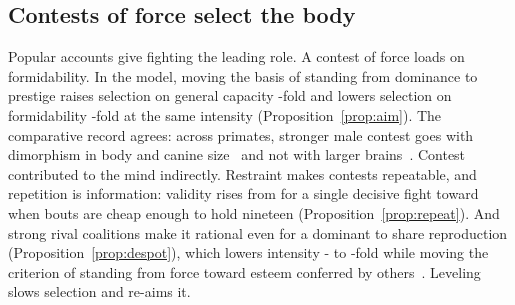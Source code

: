 \subsection{Contests of force select the body}\label{sec:rescontest}

Popular accounts give fighting the leading role. A contest of force loads on formidability. In the model, moving the basis
of standing from dominance to prestige raises selection on general capacity \AimGain-fold and lowers selection on
formidability \AimLoss-fold at the same intensity (Proposition~\ref{prop:aim}). The comparative record agrees: across primates,
stronger male contest goes with dimorphism in body and canine size~\cite{plavcan2012} and not with larger
brains~\cite{schillaci2006,lemaitre2009,fitzpatrick2012}. Contest contributed to the mind indirectly. Restraint makes contests
repeatable, and repetition is information: validity rises from \RepROne{} for a single decisive fight toward \RepRsafe{} when
bouts are cheap enough to hold nineteen (Proposition~\ref{prop:repeat}). And strong rival coalitions make it rational even for
a dominant to share reproduction (Proposition~\ref{prop:despot}), which lowers intensity \DesIntLo- to \DesIntHi-fold while
moving the criterion of standing from force toward esteem conferred by others~\cite{boehm1993,wrangham2018}. Leveling slows
selection and re-aims it.

